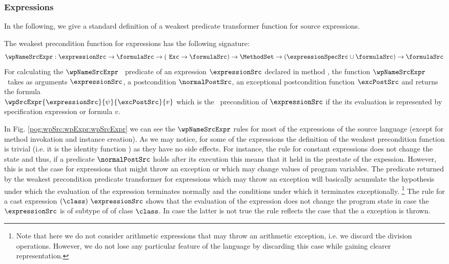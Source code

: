 \subsubsection{Expressions}\label{pog:wpSrc:wpExpr}
In the following, we  give a standard  definition of a weakest
predicate transformer function for source expressions. 




The weakest precondition function for expressions has the following signature:
$$ \wpNameSrcExpr : \expressionSrc \rightarrow \formulaSrc \rightarrow ( \mbox{ \rm \texttt{Exc}} \rightarrow  \formulaSrc ) \rightarrow  
\MethodSet \rightarrow   (\expressionSpecSrc \cup \formulaSrc)  \rightarrow  \formulaSrc $$
For calculating the  $\wpNameSrcExpr$ \ predicate  of  an expression $\expressionSrc$ declared in method \methodd,
 the function $\wpNameSrcExpr$ \ takes as arguments  $\expressionSrc$, a postcondition $\normalPostSrc$, an exceptional postcondition 
function $\excPostSrc$  and 
  returns the    formula \\
$\wpSrcExpr{\expressionSrc}{\psi}{\excPostSrc}{ v }$ which is the \wpName \ precondition of $\expressionSrc$ 
if the its evaluation is represented by  specification expression or formula $v$.

In Fig. \ref{pog:wpSrc:wpExpr:wpSrcExpr} we can see the $\wpNameSrcExpr$ rules for  most of the expressions of the source language (except for method invokation 
and instance creation).
As we may notice, for some of the expressions   
the definition of the weakest precondition function is trivial (i.e. it is the identity function )
 as they have  no side effects. For instance, the rule for constant expressions does not change the state and thus, if a predicate $ \normalPostSrc$ holds
 after its execution this means that it held in the prestate of the expession. 
 However, this is not the case for expressions that might throw an exception or which may change values of program variables.
 The predicate returned by the weakest precondition predicate transformer for expressions which may throw an exception 
will basically acumulate the hypothesis under which the evaluation 
of the expression terminates normally and the  conditions under which it  terminates exceptionally.
\footnote{Note that here we do not consider arithmetic expressions that may throw
an arithmetic exception, i.e. we discard the division operations.
 However,   we do not lose any particular feature of the language by discarding this case 
while gaining clearer representation.} 
The rule for a cast expression $( \class ) \ \expressionSrc$ shows that the evaluation of the expression
does not change the program state in case the $ \expressionSrc$ is of subtype of of class  $\class$. In case the latter is not true 
the rule reflects the case that the a  \ClassCastExc{} exception is thrown.


